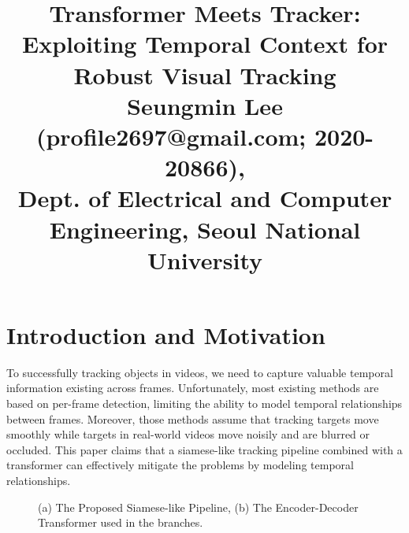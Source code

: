 \documentclass[10pt,twocolumn,letterpaper]{article}
\begin{document}
\title{Transformer Meets Tracker: \\Exploiting Temporal Context for Robust Visual Tracking
\\ {\rm {\normalsize Seungmin Lee (profile2697@gmail.com; 2020-20866), \\Dept. of Electrical and Computer Engineering, Seoul National University}}}   %

\maketitle
\thispagestyle{empty}

\section{Introduction and Motivation}
To successfully tracking objects in videos, we need to capture valuable temporal information existing across frames. Unfortunately, most existing methods are based on per-frame detection, limiting the ability to model temporal relationships between frames. Moreover, those methods assume that tracking targets move smoothly while targets in real-world videos move noisily and are blurred or occluded.  This paper claims that a siamese-like tracking pipeline combined with a transformer can effectively mitigate the problems by modeling temporal relationships.

\begin{figure}[b]
	\centering
	\caption{(a) The Proposed Siamese-like Pipeline, (b) The Encoder-Decoder Transformer used in the branches.}
	\label{fig:imgs}
\end{figure}
\end{document}
